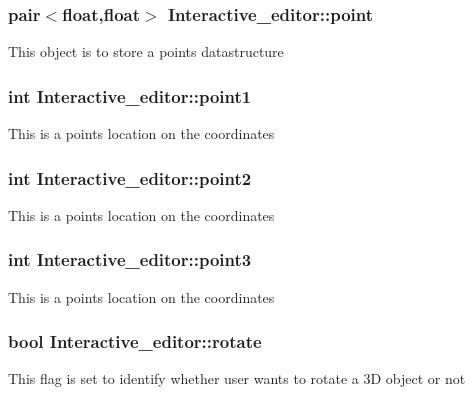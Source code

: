\subsubsection[{\texorpdfstring{point}{point}}]{\setlength{\rightskip}{0pt plus 5cm}pair$<$float,float$>$ Interactive\+\_\+editor\+::point}\hypertarget{classInteractive__editor_a5b1e9a4bfa2a98c594828367eeaf2acf}{}\label{classInteractive__editor_a5b1e9a4bfa2a98c594828367eeaf2acf}
This object is to store a point\textquotesingle{}s datastructure 
\subsubsection[{\texorpdfstring{point1}{point1}}]{\setlength{\rightskip}{0pt plus 5cm}int Interactive\+\_\+editor\+::point1}\hypertarget{classInteractive__editor_a07fe2897bcad8eabf5b98e01a162b2a1}{}\label{classInteractive__editor_a07fe2897bcad8eabf5b98e01a162b2a1}
This is a point\textquotesingle{}s location on the coordinates 
\subsubsection[{\texorpdfstring{point2}{point2}}]{\setlength{\rightskip}{0pt plus 5cm}int Interactive\+\_\+editor\+::point2}\hypertarget{classInteractive__editor_af60245cb328db4c6b1ca00f1512dfc75}{}\label{classInteractive__editor_af60245cb328db4c6b1ca00f1512dfc75}
This is a point\textquotesingle{}s location on the coordinates 
\subsubsection[{\texorpdfstring{point3}{point3}}]{\setlength{\rightskip}{0pt plus 5cm}int Interactive\+\_\+editor\+::point3}\hypertarget{classInteractive__editor_a9b368072fc0a220476d21079b4bcb739}{}\label{classInteractive__editor_a9b368072fc0a220476d21079b4bcb739}
This is a point\textquotesingle{}s location on the coordinates 
\subsubsection[{\texorpdfstring{rotate}{rotate}}]{\setlength{\rightskip}{0pt plus 5cm}bool Interactive\+\_\+editor\+::rotate}\hypertarget{classInteractive__editor_a9accc369abf6972993bb5c2ba047542c}{}\label{classInteractive__editor_a9accc369abf6972993bb5c2ba047542c}
This flag is set to identify whether user wants to rotate a 3D object or not 
